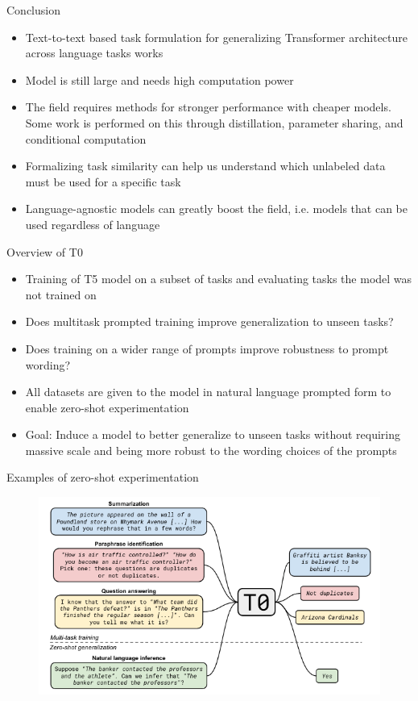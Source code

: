 \documentclass[english]{mlutalk}
\begin{document}
\begin{frame}{Conclusion}
    \begin{itemize}
      \item Text-to-text based task formulation for generalizing Transformer architecture across language tasks works
      \item Model is still large and needs high computation power
      \item The field requires methods for stronger performance with cheaper models. Some work is performed on this through distillation, parameter sharing, and conditional computation
      \item  Formalizing task similarity can help us understand which unlabeled data must be used for a specific task
      \item Language-agnostic models can greatly boost the field, i.e. models that can be used regardless of language
    \end{itemize}
\end{frame}

\begin{frame}{Overview of T0~\cite{SanhWRBSACSLRDBXTSSKCNDCJWMSYPBWNRSSFFTBGBWR2021}}
    \begin{itemize}
      \item Training of T5 model on a subset of tasks and evaluating tasks the model was not trained on
      \item Does multitask prompted training improve generalization to unseen tasks?
      \item Does training on a wider range of prompts improve robustness to prompt wording?
      \item All datasets are given to the model in natural language prompted form to enable zero-shot experimentation
      \item Goal: Induce a model to better generalize to unseen tasks without requiring massive scale and being more robust to the
      wording choices of the prompts
    \end{itemize}
\end{frame}

\begin{frame}{Examples of zero-shot experimentation}
    \begin{figure}
        \centering
        \includegraphics[width=\linewidth]{figures/t0_examples.png}
    \end{figure}
\end{frame}
\end{document}

